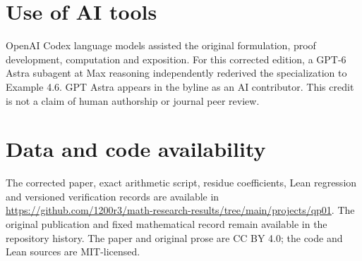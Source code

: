 \documentclass[11pt,reqno]{amsart}
\theoremstyle{remark}
\begin{document}
\section*{Use of AI tools}
OpenAI Codex language models assisted the original formulation,
proof development, computation and exposition. For this corrected
edition, a GPT-6 Astra subagent at Max reasoning independently
rederived the specialization to Example 4.6. GPT Astra appears
in the byline as an AI contributor. This credit is not a claim of
human authorship or journal peer review.

\section*{Data and code availability}
The corrected paper, exact arithmetic script, residue coefficients,
Lean regression and versioned verification records are available in
\url{https://github.com/1200r3/math-research-results/tree/main/projects/qp01}.
The original publication and fixed mathematical record remain available
in the repository history. The paper and original prose are CC BY 4.0;
the code and Lean sources are MIT-licensed.



\end{document}
